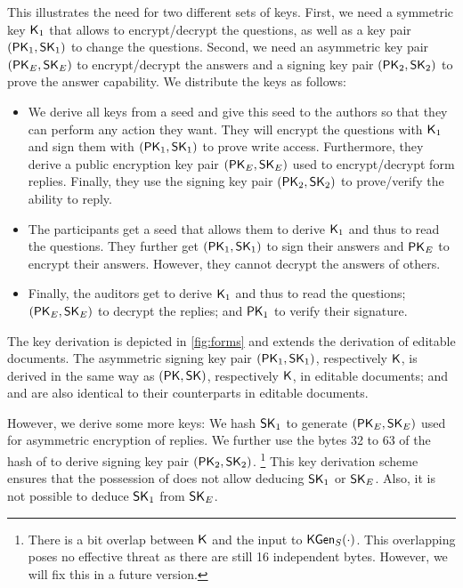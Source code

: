 This illustrates the need for two different sets of keys.
First, we need a symmetric key $\mySymKey_1$ that allows to encrypt/decrypt the questions, as well as a key pair $\myKeyPair{_1}$ to change the questions.
Second, we need an asymmetric key pair $\myKeyPair{_E}$ to encrypt/decrypt the answers and a signing key pair $\myKeyPair{_2}$ to prove the answer capability.
We distribute the keys as follows:
\begin{itemize}
  \item We derive all keys from a seed \myEditKeyStr and give this seed to the authors so that they can perform any action they want.
    They will encrypt the questions with $\mySymKey_1$ and sign them with $\myKeyPair{_1}$ to prove write access.
    Furthermore, they derive a public encryption key pair $\myKeyPair{_E}$ used to encrypt/decrypt form replies.
    Finally, they use the signing key pair $\myKeyPair{_2}$ to prove/verify the ability to reply.
  \item The participants get a seed \myViewKeyStr that allows them to derive $\mySymKey_1$ and thus to read the questions.
    They further get $\myKeyPair{_1}$ to sign their answers and $\myPK_E$ to encrypt their answers.
    However, they cannot decrypt the answers of others.
  \item Finally, the auditors get \myViewKeyStr to derive $\mySymKey_1$ and thus to read the questions; $\myKeyPair{_E}$ to decrypt the replies; and $\myPK_1$ to verify their signature.
\end{itemize}

\begin{figure*}[t!]
  \centering
  
  \caption{Key derivation for a form}
  \label{fig:forms}
\end{figure*}

The key derivation is depicted in \cref{fig:forms} and extends the derivation of editable documents.
The asymmetric signing key pair $\myKeyPair{_1}$, respectively $\mySymKey$, is derived in the same way as $\myKeyPair{}$, respectively $\mySymKey$, in editable documents; and \myViewKeyStr and \mychanID are also identical to their counterparts in editable documents.

However, we derive some more keys:
We hash $\mySK_1$ to generate $\myKeyPair{_E}$ used for asymmetric encryption of replies.
We further use the bytes 32 to 63 of the hash of \myViewKeyStr to derive signing key pair $\myKeyPair{_2}$.%
\footnote{There is a bit overlap between $\mySymKey$ and the input to $\myKGen[_S]{\cdot}$.
 This overlapping poses no effective threat as there are still 16 independent bytes.
 However, we will fix this in a future version.}
This key derivation scheme ensures that the possession of \myViewKeyStr does not allow deducing $\mySK_1$ or $\mySK_E$.
Also, it is not possible to deduce $\mySK_1$ from $\mySK_E$.

